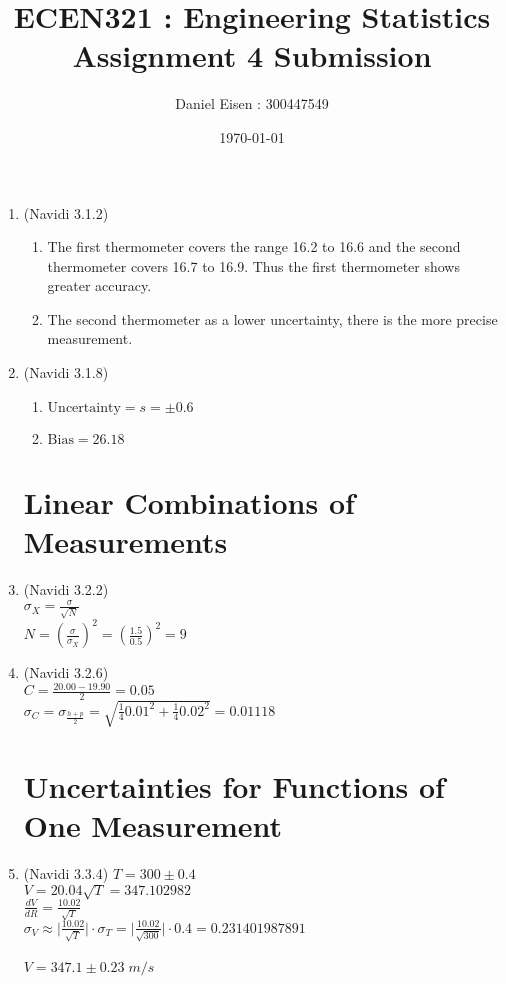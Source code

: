 \documentclass[11pt]{article}
\title{ECEN321 : Engineering Statistics \\ Assignment 4 Submission}
\author{Daniel Eisen : 300447549}
\date{\today}
\begin{document}
\maketitle
\begin{enumerate}
\section*{Measurement Error}
\item (Navidi 3.1.2) %
\begin{enumerate}
        \item The first thermometer covers the range 16.2 to 16.6 and the second thermometer covers 16.7 to 16.9. Thus the first thermometer shows greater accuracy.
        \item The second thermometer as a lower uncertainty, there is the more precise measurement.
\end{enumerate}

\item (Navidi 3.1.8) %
\begin{enumerate}
        \item $\mathrm{Uncertainty} = s = \pm 0.6$
        \item $\mathrm{Bias} = 26.18$
\end{enumerate} 

\section*{Linear Combinations of Measurements}
\item (Navidi 3.2.2) \\ %
        $\sigma_{X} = \frac{\sigma}{\sqrt{N}}$ \\
        $N = (\frac{\sigma}{\sigma_X})^{2} = (\frac{1.5}{0.5})^{2} = 9 $
\item (Navidi 3.2.6) \\ %
        $C = \frac{20.00-19.90}{2} = 0.05$ \\
        $\sigma_{C} = \sigma_{\frac{h + p}{2}} = \sqrt{\frac{1}{4}0.01^{2}+\frac{1}{4}0.02^{2}} = 0.01118$

\section*{Uncertainties for Functions of One Measurement}
\item (Navidi 3.3.4) $T = 300 \pm 0.4$ \\ %
        $V = 20.04\sqrt{T} = 347.102982$ \\
        $\frac{dV}{dR} = \frac{10.02}{\sqrt{T}}$ \\
        $\sigma_{V} \approx {\big|}\frac{10.02}{\sqrt{T}}{\big|}{\cdot}\sigma_T = {\big|}\frac{10.02}{\sqrt{300}}{\big|}{\cdot}0.4 = 0.231401987891$ \\ \\
        $V = 347.1 \pm 0.23 \; m/s$


\end{enumerate}
\end{document}
